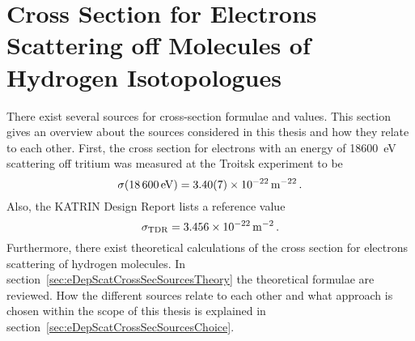 \section{Cross Section for Electrons Scattering off Molecules of Hydrogen Isotopologues}
\label{sec:eDepScatCrossSecSources}
There exist several sources for cross-section formulae and values. This section gives an overview about the sources considered in this thesis and how they relate to each other. First, the cross section for electrons with an energy of \SI{18600}{eV} scattering off tritium was measured at the Troitsk experiment to be~\cite{Aseev2000}
\begin{equation}
	\sigma(\SI{18600}{eV}) = \SI{3.40\pm0.07e-22}{m^{-22}} \fullstop
\end{equation}
Also, the KATRIN Design Report lists a reference value~\cite{Angrik:2005ep}
\begin{equation}
	\label{eq:eDepScatCrossSecSourcesCrossSecTDR}
	\sigma_\mathrm{TDR} = \SI{3.456e-22}{m^{-2}} \fullstop
\end{equation}
Furthermore, there exist theoretical calculations of the cross section for electrons scattering of hydrogen molecules. In section~\ref{sec:eDepScatCrossSecSourcesTheory} the theoretical formulae are reviewed. How the different sources relate to each other and what approach is chosen within the scope of this thesis is explained in section~\ref{sec:eDepScatCrossSecSourcesChoice}.
